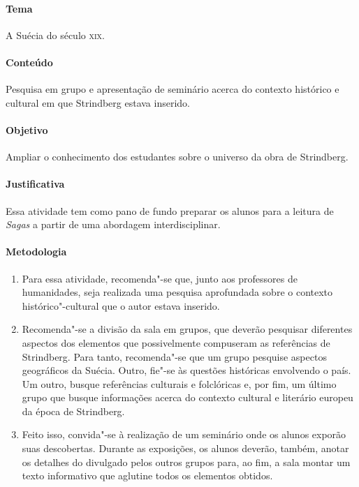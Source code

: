 \documentclass[12pt]{extarticle}
\begin{document}
\paragraph{Tema} A Suécia do século \textsc{xix}.

\paragraph{Conteúdo} Pesquisa em grupo e apresentação de seminário acerca do contexto histórico e cultural em que Strindberg estava inserido. 

\paragraph{Objetivo} Ampliar o conhecimento dos estudantes sobre o universo da obra de Strindberg.

\paragraph{Justificativa} Essa atividade tem como pano de fundo preparar os alunos para a leitura de \emph{Sagas}
a partir de uma abordagem interdisciplinar.

\paragraph{Metodologia}

\begin{enumerate}

\item Para essa atividade, recomenda"-se que, junto aos professores de humanidades, seja
realizada uma pesquisa aprofundada sobre o contexto histórico"-cultural
que o autor estava inserido.

\item Recomenda"-se a divisão da
sala em grupos, que deverão pesquisar diferentes aspectos dos elementos que
possivelmente compuseram as referências de Strindberg. Para tanto,
recomenda"-se que um grupo pesquise aspectos geográficos da Suécia.
Outro, fie"-se às questões históricas envolvendo o país. Um outro, busque
referências culturais e folclóricas e, por fim, um último grupo que busque
informações acerca do contexto cultural e literário europeu da época de
Strindberg.

\item Feito isso, convida"-se à realização de um seminário onde os
alunos exporão suas descobertas. Durante as exposições, os alunos
deverão, também, anotar os detalhes do divulgado pelos outros grupos
para, ao fim, a sala montar um texto informativo que aglutine todos os
elementos obtidos.

\end{enumerate}
\end{document}

